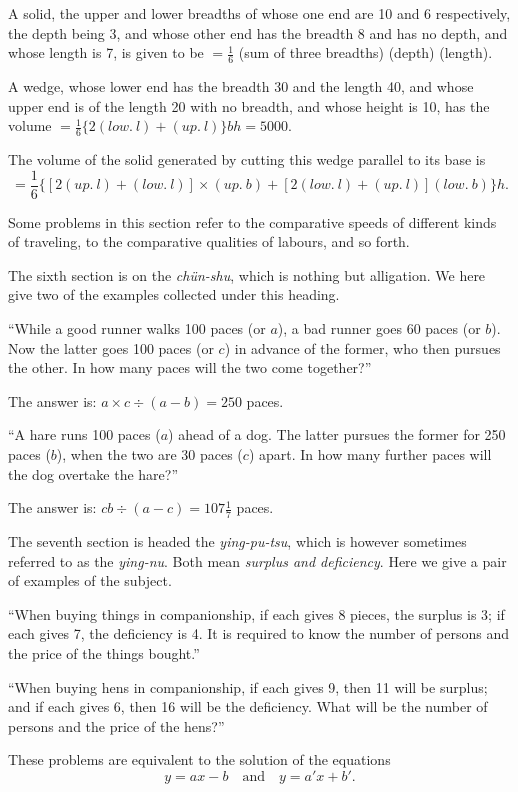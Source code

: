 \documentclass[11pt]{article}
\newcommand{\scanpage}[2]{\clearpage\setcounter{footnote}{0}\noindent{\footnotesize\color{gray}PDF page #1 · #2}\par\medskip}
\newcommand{\scanfooter}{}
\begin{document}
A solid, the upper and lower breadths of whose one end are 10 and 6 respectively, the depth being 3, and whose other end has the breadth 8 and has no depth, and whose length is 7, is given to be $=\frac16$ (sum of three breadths) (depth) (length).

A wedge, whose lower end has the breadth 30 and the length 40, and whose upper end is of the length 20 with no breadth, and whose height is 10, has the volume $=\frac16\{2(low.\ l)+(up.\ l)\}bh=5000$.

The volume of the solid generated by cutting this wedge parallel to its base is
\[
=\frac16\{[2(up.\ l)+(low.\ l)]\times(up.\ b)+[2(low.\ l)+(up.\ l)](low.\ b)\}h.
\]
\scanfooter

\scanpage{0030}{Chapter 3, printed page 16}
Some problems in this section refer to the comparative speeds of different kinds of traveling, to the comparative qualities of labours, and so forth.

The sixth section is on the \emph{chün-shu}, which is nothing but alligation. We here give two of the examples collected under this heading.

``While a good runner walks 100 paces (or $a$), a bad runner goes 60 paces (or $b$). Now the latter goes 100 paces (or $c$) in advance of the former, who then pursues the other. In how many paces will the two come together?''

The answer is: $a\times c\div(a-b)=250$ paces.

``A hare runs 100 paces ($a$) ahead of a dog. The latter pursues the former for 250 paces ($b$), when the two are 30 paces ($c$) apart. In how many further paces will the dog overtake the hare?''

The answer is: $cb\div(a-c)=107\frac17$ paces.

The seventh section is headed the \emph{ying-pu-tsu}, which is however sometimes referred to as the \emph{ying-nu}. Both mean \emph{surplus and deficiency}. Here we give a pair of examples of the subject.

``When buying things in companionship, if each gives 8 pieces, the surplus is 3; if each gives 7, the deficiency is 4. It is required to know the number of persons and the price of the things bought.''

``When buying hens in companionship, if each gives 9, then 11 will be surplus; and if each gives 6, then 16 will be the deficiency. What will be the number of persons and the price of the hens?''

These problems are equivalent to the solution of the equations
\[
y=ax-b\quad \text{and}\quad y=a'x+b'.
\]
\end{document}
